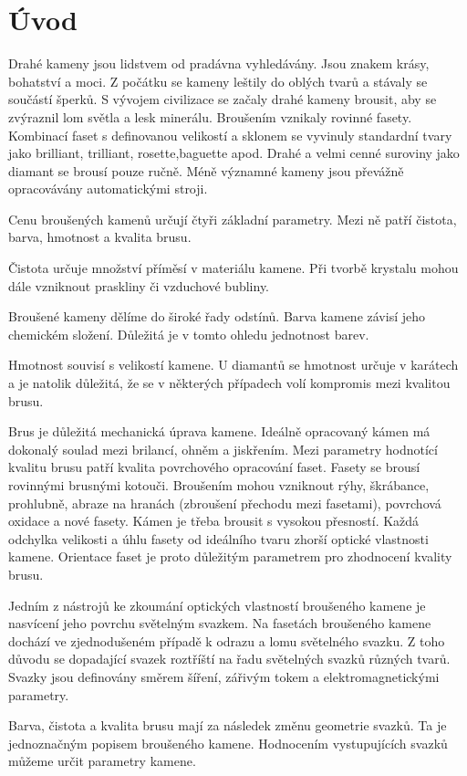 \chapter{Úvod}

Drahé kameny jsou lidstvem od pradávna vyhledávány.
Jsou znakem krásy, bohatství a moci. Z počátku se kameny leštily do oblých tvarů a stávaly se součástí šperků.
S vývojem civilizace se začaly drahé kameny brousit, aby se zvýraznil lom světla a lesk minerálu. Broušením vznikaly rovinné fasety. Kombinací faset s definovanou velikostí a sklonem se vyvinuly standardní tvary jako brilliant, trilliant, rosette,baguette apod. Drahé a velmi cenné suroviny jako diamant se brousí pouze ručně. Méně významné kameny jsou převážně opracovávány automatickými stroji.  

Cenu broušených kamenů určují čtyři základní parametry. Mezi ně patří čistota, barva, hmotnost a kvalita brusu. 

Čistota určuje množství příměsí v materiálu kamene. Při tvorbě krystalu mohou dále vzniknout praskliny či vzduchové bubliny. 

Broušené kameny dělíme do široké řady odstínů. Barva kamene závisí jeho chemickém složení. Důležitá je v tomto ohledu jednotnost barev.

Hmotnost souvisí s velikostí kamene. U diamantů se hmotnost určuje v karátech  a je natolik důležitá, že se v některých případech volí kompromis mezi kvalitou brusu.

Brus je důležitá mechanická úprava kamene. Ideálně opracovaný kámen má dokonalý soulad mezi brilancí, ohněm a jiskřením. Mezi parametry hodnotící kvalitu brusu patří kvalita povrchového opracování faset. Fasety se brousí rovinnými brusnými kotouči. Broušením mohou vzniknout rýhy, škrábance, prohlubně, abraze na hranách (zbroušení přechodu mezi fasetami), povrchová oxidace a nové fasety. Kámen je třeba brousit s vysokou přesností. Každá odchylka velikosti a úhlu fasety od ideálního tvaru zhorší optické vlastnosti kamene. Orientace faset je proto důležitým parametrem pro zhodnocení kvality brusu.

Jedním z nástrojů ke zkoumání optických vlastností broušeného kamene je nasvícení jeho povrchu světelným svazkem. Na fasetách broušeného kamene dochází ve zjednodušeném případě k odrazu a lomu světelného svazku. Z toho důvodu se dopadající svazek roztříští na řadu světelných svazků různých tvarů. Svazky jsou definovány směrem šíření, zářivým tokem a elektromagnetickými parametry. 

Barva, čistota a kvalita brusu mají za následek změnu geometrie svazků. Ta je jednoznačným popisem broušeného kamene. Hodnocením vystupujících svazků můžeme určit parametry kamene. 

